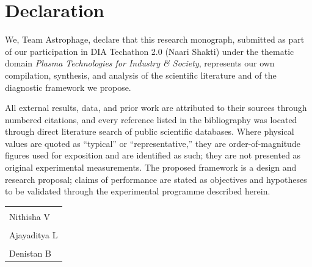 \chapter*{Declaration}

We, Team Astrophage, declare that this research monograph, submitted as part of
our participation in DIA Techathon 2.0 (Naari Shakti) under the thematic domain
\emph{Plasma Technologies for Industry \& Society}, represents our own compilation,
synthesis, and analysis of the scientific literature and of the diagnostic
framework we propose.

All external results, data, and prior work are attributed to their sources through
numbered citations, and every reference listed in the bibliography was located
through direct literature search of public scientific databases. Where physical
values are quoted as ``typical'' or ``representative,'' they are order-of-magnitude
figures used for exposition and are identified as such; they are not presented as
original experimental measurements. The proposed framework is a design and research
proposal; claims of performance are stated as objectives and hypotheses to be
validated through the experimental programme described herein.

\vspace{1.2cm}
\noindent
\begin{tabular}{@{}p{7cm}@{}}
\hrulefill \\
Nithisha V \\[0.7cm]
\hrulefill \\
Ajayaditya L \\[0.7cm]
\hrulefill \\
Denistan B \\
\end{tabular}
\cleardoublepage
